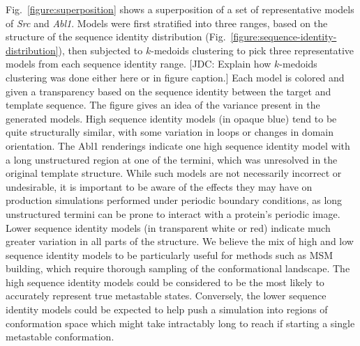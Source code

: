 \documentclass[aps,pre,twocolumn,nofootinbib,superscriptaddress,linenumbers]{revtex4-1}
\begin{document}
Fig.~\ref{figure:superposition} shows a superposition of a set of representative models of \emph{Src} and \emph{Abl1}.
Models were first stratified into three ranges, based on the structure of the sequence identity distribution (Fig.~\ref{figure:sequence-identity-distribution}), then subjected to $k$-medoids clustering to pick three representative models from each sequence identity range.
{\color{red}[JDC: Explain how $k$-medoids clustering was done either here or in figure caption.]}
Each model is colored and given a transparency based on the sequence identity between the target and template sequence.
The figure gives an idea of the variance present in the generated models.
High sequence identity models (in opaque blue) tend to be quite structurally similar, with some variation in loops or changes in domain orientation.
The Abl1 renderings indicate one high sequence identity model with a long unstructured region at one of the termini, which was unresolved in the original template structure.
While such models are not necessarily incorrect or undesirable, it is important to be aware of the effects they may have on production simulations performed under periodic boundary conditions, as long unstructured termini can be prone to interact with a protein's periodic image.
Lower sequence identity models (in transparent white or red) indicate much greater variation in all parts of the structure.
We believe the mix of high and low sequence identity models to be particularly useful for methods such as MSM building, which require thorough sampling of the conformational landscape.
The high sequence identity models could be considered to be the most likely to accurately represent true metastable states.
Conversely, the lower sequence identity models could be expected to help push a simulation into regions of conformation space which might take intractably long to reach if starting a single metastable conformation.
\end{document}
